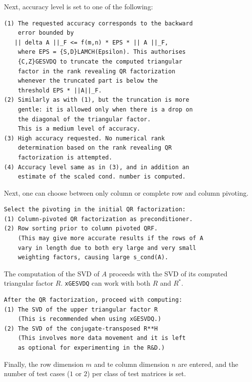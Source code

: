 \documentclass[12pt, a4paper, final]{article}
\numberwithin{equation}{section}
\begin{document}
\noindent Next, accuracy level is set to one of the following:

\begin{verbatim}                         
(1) The requested accuracy corresponds to the backward
    error bounded by                                  
   || delta A ||_F <= f(m,n) * EPS * || A ||_F,       
    where EPS = {S,D}LAMCH(Epsilon). This authorises  
    {C,Z}GESVDQ to truncate the computed triangular   
    factor in the rank revealing QR factorization     
    whenever the truncated part is below the          
    threshold EPS * ||A||_F.                          
(2) Similarly as with (1), but the truncation is more 
    gentle: it is allowed only when there is a drop on
    the diagonal of the triangular factor.           
    This is a medium level of accuracy.               
(3) High accuracy requested. No numerical rank        
    determination based on the rank revealing QR      
    factorization is attempted.                       
(4) Accuracy level same as in (3), and in addition an  
    estimate of the scaled cond. number is computed.  
\end{verbatim}

\noindent Next, one can choose between only column or complete row and column pivoting. 

\begin{verbatim}
Select the pivoting in the initial QR factorization:
(1) Column-pivoted QR factorization as preconditioner.
(2) Row sorting prior to column pivoted QRF.
    (This may give more accurate results if the rows of A
    vary in length due to both ery large and very small
    weighting factors, causing large s_cond(A). 
\end{verbatim}

\noindent The computation of the SVD of $A$ proceeds with the SVD
of its computed triangular factor $R$. \texttt{xGESVDQ} can work
with both $R$ and $R^*$.

\begin{verbatim}
After the QR factorization, proceed with computing:
(1) The SVD of the upper triangular factor R 
    (This is recommended when using xGESVDQ.)
(2) The SVD of the conjugate-transposed R**H 
    (This involves more data movement and it is left
    as optional for experimenting in the R&D.)
\end{verbatim}

\noindent Finally, the row dimension $m$ and te column dimension $n$ are entered, and the number of test cases ($1$ or $2$) per class of test matrices is set.
\end{document}
